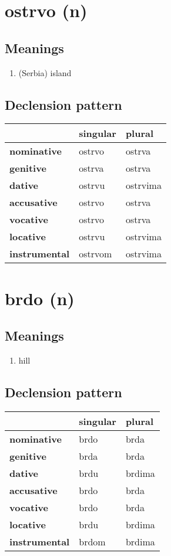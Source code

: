 \filbreak
\section{ostrvo (n)}
\subsection*{Meanings}
\begin{enumerate}
\item (Serbia) island
\end{enumerate}
\subsection*{Declension pattern}
\begin{tabularx}{\linewidth}{Xll}
\toprule
{} & singular &    plural \\
\midrule
\textbf{nominative  } &   ostrvo &    ostrva \\
\textbf{genitive    } &   ostrva &    ostrva \\
\textbf{dative      } &   ostrvu &  ostrvima \\
\textbf{accusative  } &   ostrvo &    ostrva \\
\textbf{vocative    } &   ostrvo &    ostrva \\
\textbf{locative    } &   ostrvu &  ostrvima \\
\textbf{instrumental} &  ostrvom &  ostrvima \\
\bottomrule
\end{tabularx}

\filbreak
\section{brdo (n)}
\subsection*{Meanings}
\begin{enumerate}
\item hill
\end{enumerate}
\subsection*{Declension pattern}
\begin{tabularx}{\linewidth}{Xll}
\toprule
{} & singular &  plural \\
\midrule
\textbf{nominative  } &     brdo &    brda \\
\textbf{genitive    } &     brda &    brda \\
\textbf{dative      } &     brdu &  brdima \\
\textbf{accusative  } &     brdo &    brda \\
\textbf{vocative    } &     brdo &    brda \\
\textbf{locative    } &     brdu &  brdima \\
\textbf{instrumental} &    brdom &  brdima \\
\bottomrule
\end{tabularx}

